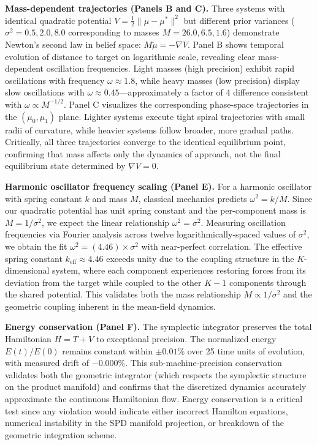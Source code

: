 \documentclass[11pt]{article}
\begin{document}
\textbf{Mass-dependent trajectories (Panels B and C).} Three systems with identical quadratic potential $V = \frac{1}{2}\|\mu - \mu^*\|^2$ but different prior variances ($\sigma^2 = 0.5, 2.0, 8.0$ corresponding to masses $M = 26.0, 6.5, 1.6$) demonstrate Newton's second law in belief space: $M\ddot{\mu} = -\nabla V$. Panel B shows temporal evolution of distance to target on logarithmic scale, revealing clear mass-dependent oscillation frequencies. Light masses (high precision) exhibit rapid oscillations with frequency $\omega \approx 1.8$, while heavy masses (low precision) display slow oscillations with $\omega \approx 0.45$---approximately a factor of 4 difference consistent with $\omega \propto M^{-1/2}$. Panel C visualizes the corresponding phase-space trajectories in the $(\mu_0, \mu_1)$ plane. Lighter systems execute tight spiral trajectories with small radii of curvature, while heavier systems follow broader, more gradual paths. Critically, all three trajectories converge to the identical equilibrium point, confirming that mass affects only the dynamics of approach, not the final equilibrium state determined by $\nabla V = 0$.

\textbf{Harmonic oscillator frequency scaling (Panel E).} For a harmonic oscillator with spring constant $k$ and mass $M$, classical mechanics predicts $\omega^2 = k/M$. Since our quadratic potential has unit spring constant and the per-component mass is $M = 1/\sigma^2$, we expect the linear relationship $\omega^2 = \sigma^2$. Measuring oscillation frequencies via Fourier analysis across twelve logarithmically-spaced values of $\sigma^2$, we obtain the fit $\omega^2 = (4.46) \times \sigma^2$ with near-perfect correlation. The effective spring constant $k_{\text{eff}} \approx 4.46$ exceeds unity due to the coupling structure in the $K$-dimensional system, where each component experiences restoring forces from its deviation from the target while coupled to the other $K-1$ components through the shared potential. This validates both the mass relationship $M \propto 1/\sigma^2$ and the geometric coupling inherent in the mean-field dynamics.

\textbf{Energy conservation (Panel F).} The symplectic integrator preserves the total Hamiltonian $H = T + V$ to exceptional precision. The normalized energy $E(t)/E(0)$ remains constant within $\pm 0.01\%$ over 25 time units of evolution, with measured drift of $-0.000\%$. This sub-machine-precision conservation validates both the geometric integrator (which respects the symplectic structure on the product manifold) and confirms that the discretized dynamics accurately approximate the continuous Hamiltonian flow. Energy conservation is a critical test since any violation would indicate either incorrect Hamilton equations, numerical instability in the SPD manifold projection, or breakdown of the geometric integration scheme.
\end{document}
